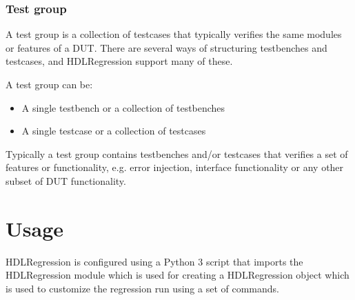 \documentclass[letterpaper,10pt,english]{sphinxmanual}
\let\sphinxpxdimen\pdfpxdimen\else\newdimen\sphinxpxdimen
\begin{document}
\subsection{Test group}
\label{\detokenize{intro:test-group}}
\sphinxAtStartPar
A test group is a collection of testcases that typically verifies the same modules or features of a DUT.
There are several ways of structuring testbenches and testcases, and HDLRegression support many of these.

\sphinxAtStartPar
A test group can be:
\begin{itemize}
\item {} 
\sphinxAtStartPar
A single testbench or a collection of testbenches

\item {} 
\sphinxAtStartPar
A single testcase or a collection of testcases

\end{itemize}

\sphinxAtStartPar
Typically a test group contains testbenches and/or testcases that verifies a set of features or functionality,
e.g. error injection, interface functionality or any other sub\sphinxhyphen{}set of DUT functionality.

\noindent{\hspace*{\fill}\sphinxincludegraphics[width=400\sphinxpxdimen]{{test_group}.png}\hspace*{\fill}}


\chapter{Usage}
\label{\detokenize{intro:usage}}
\sphinxAtStartPar
HDLRegression is configured using a Python 3 script that imports the HDLRegression module which is used for creating a HDLRegression
object which is used to customize the regression run using a set of {\hyperref[\detokenize{api::doc}]{}} commands.
\end{document}
